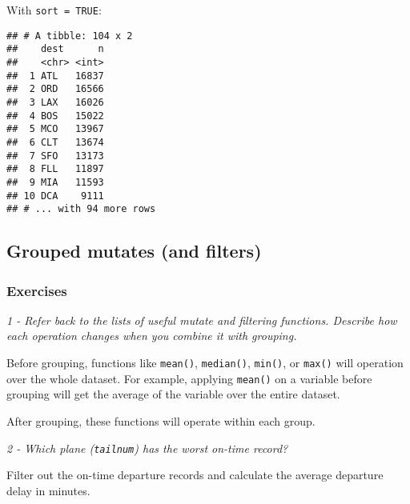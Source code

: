 \documentclass[]{article}
\newenvironment{Shaded}{\begin{snugshade}}{\end{snugshade}}
\newcommand{\KeywordTok}[1]{\textcolor[rgb]{0.13,0.29,0.53}{\textbf{#1}}}
\newcommand{\DataTypeTok}[1]{\textcolor[rgb]{0.13,0.29,0.53}{#1}}
\newcommand{\DecValTok}[1]{\textcolor[rgb]{0.00,0.00,0.81}{#1}}
\newcommand{\StringTok}[1]{\textcolor[rgb]{0.31,0.60,0.02}{#1}}
\newcommand{\OtherTok}[1]{\textcolor[rgb]{0.56,0.35,0.01}{#1}}
\newcommand{\OperatorTok}[1]{\textcolor[rgb]{0.81,0.36,0.00}{\textbf{#1}}}
\newcommand{\NormalTok}[1]{#1}
\theoremstyle{definition}
\theoremstyle{definition}
\theoremstyle{definition}
\theoremstyle{remark}
\begin{document}
With \texttt{sort\ =\ TRUE}:

\begin{Shaded}
\end{Shaded}

\begin{verbatim}
## # A tibble: 104 x 2
##    dest      n
##    <chr> <int>
##  1 ATL   16837
##  2 ORD   16566
##  3 LAX   16026
##  4 BOS   15022
##  5 MCO   13967
##  6 CLT   13674
##  7 SFO   13173
##  8 FLL   11897
##  9 MIA   11593
## 10 DCA    9111
## # ... with 94 more rows
\end{verbatim}

\subsection{Grouped mutates (and
filters)}\label{grouped-mutates-and-filters}

\subsubsection{Exercises}\label{exercises-12}

\emph{1 - Refer back to the lists of useful mutate and filtering
functions. Describe how each operation changes when you combine it with
grouping.}

Before grouping, functions like \texttt{mean()}, \texttt{median()},
\texttt{min()}, or \texttt{max()} will operation over the whole dataset.
For example, applying \texttt{mean()} on a variable before grouping will
get the average of the variable over the entire dataset.

After grouping, these functions will operate within each group.

\emph{2 - Which plane (\texttt{tailnum}) has the worst on-time record?}

Filter out the on-time departure records and calculate the average
departure delay in minutes.

\begin{Shaded}
\end{Shaded}
\end{document}
